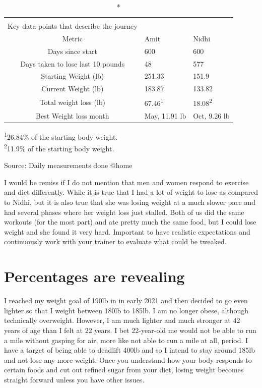 \documentclass[
  oneside]{book}
\begin{document}
\captionsetup[table]{labelformat=empty,skip=1pt}
\begin{longtable}{cll}
\caption*{
{\large \textbf{Important Metrics}} \\ 
{\small Key data points that describe the journey}
} \\ 
\toprule
Metric & Amit & Nidhi \\ 
\midrule
Days since start & 600 & 600 \\ 
Days taken to lose last 10 pounds & 48 & 577 \\ 
Starting Weight (lb) & 251.33 & 151.9 \\ 
Current Weight (lb) & 183.87 & 133.82 \\ 
Total weight loss (lb) & 67.46\textsuperscript{1} & 18.08\textsuperscript{2} \\ 
Best Weight loss month & May, 11.91 lb & Oct, 9.26 lb \\ 
 \bottomrule
\end{longtable}
\vspace{-5mm}
\begin{minipage}{\linewidth}
\textsuperscript{1}26.84\% of the starting body weight. \\ 
\textsuperscript{2}11.9\% of the starting body weight. \\ 
\end{minipage}
\begin{minipage}{\linewidth}
Source: Daily measurements done @home\\ 
\end{minipage}

I would be remiss if I do not mention that men and women respond to exercise and diet differently. While it is true that I had a lot of weight to lose as compared to Nidhi, but it is also true that she was losing weight at a much slower pace and had several phases where her weight loss just stalled. Both of us did the same workouts (for the most part) and ate pretty much the same food, but I could lose weight and she found it very hard. Important to have realistic expectations and continuously work with your trainer to evaluate what could be tweaked.

\hypertarget{percentages-are-revealing}{%
\section{Percentages are revealing}\label{percentages-are-revealing}}

I reached my weight goal of 190lb in in early 2021 and then decided to go even lighter so that I weight between 180lb to 185lb. I am no longer obese, although technically overweight. However, I am much lighter and much stronger at 42 years of age than I felt at 22 years. I bet 22-year-old me would not be able to run a mile without gasping for air, more like not able to run a mile at all, period. I have a target of being able to deadlift 400lb and so I intend to stay around 185lb and not lose any more weight. Once you understand how your body responds to certain foods and cut out refined sugar from your diet, losing weight becomes straight forward unless you have other issues.
\end{document}
